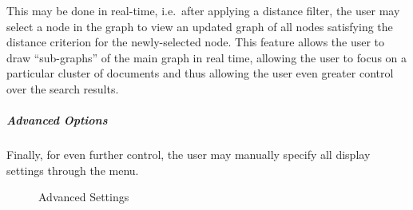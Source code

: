 This may be done in real-time, i.e.\ after applying a distance filter, the user may select a node in the graph to view an updated graph of all nodes satisfying the distance criterion for the newly-selected node. This feature allows the user to draw ``sub-graphs'' of the main graph in real time, allowing the user to focus on a particular cluster of documents and thus allowing the user even greater control over the search results.

\subparagraph{Advanced Options}
Finally, for even further control, the user may manually specify all display settings through the  menu.

\begin{figure}[h]
\centering
\caption{Advanced Settings}
\quad
{}\quad
{}
\end{figure}

